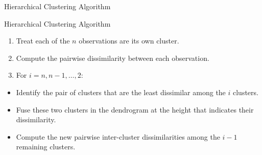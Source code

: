 \documentclass[
  ignorenonframetext,
  aspectratio=169,
]{beamer}
\begin{document}
\begin{frame}{Hierarchical Clustering Algorithm}
\protect\hypertarget{hierarchical-clustering-algorithm}{}
\begin{block}{Hierarchical Clustering Algorithm}
\protect\hypertarget{hierarchical-clustering-algorithm-1}{}
\begin{enumerate}
\item
  Treat each of the \(n\) observations are its own cluster.
\item
  Compute the pairwise dissimilarity between each observation.
\item
  For \(i = n, n-1, \dots, 2\):
\end{enumerate}

\begin{itemize}
\item
  Identify the pair of clusters that are the least dissimilar among the
  \(i\) clusters.
\item
  Fuse these two clusters in the dendrogram at the height that indicates
  their dissimilarity.
\item
  Compute the new pairwise inter-cluster dissimilarities among the
  \(i - 1\) remaining clusters.
\end{itemize}
\end{block}
\end{frame}
\end{document}
